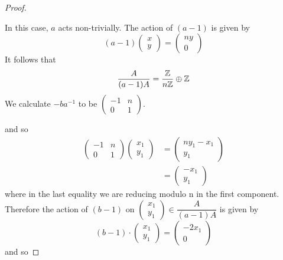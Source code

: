 \begin{proof}
    \begin{case}[Family 2]
        In this case, $a$ acts non-trivially. The action of $(a-1)$ is given by
        $$
            (a-1)\begin{pmatrix}
                x \\
                y
            \end{pmatrix} = \begin{pmatrix}
                ny \\
                0
            \end{pmatrix}
        $$
        It follows that
        $$
            \dfrac{A}{(a-1)A} = \dfrac{\mathbb{Z}}{n\mathbb{Z}} \oplus \mathbb{Z}
        $$
        We calculate $-ba^{-1}$ to be $\begin{pmatrix}
                -1 & n \\
                0  & 1
            \end{pmatrix}$.
    \end{case}
    and so
    \begin{align*}
        \begin{pmatrix}
            -1 & n \\
            0  & 1
        \end{pmatrix} \begin{pmatrix}
                          x_1 \\
                          y_1
                      \end{pmatrix} & = \begin{pmatrix}
                                            ny_1 - x_1 \\
                                            y_1
                                        \end{pmatrix}  \\
                                      & =\begin{pmatrix}
                                             - x_1 \\
                                             y_1
                                         \end{pmatrix}
    \end{align*}
    where in the last equality we are reducing modulo n in the first component. Therefore the action of $(b-1)$ on
    $\begin{pmatrix}
            x_1 \\
            y_1
        \end{pmatrix} \in \dfrac{A}{(a-1)A}$ is given by
    $$
        (b-1)\cdot \begin{pmatrix}
            x_1 \\
            y_1
        \end{pmatrix} = \begin{pmatrix}
            -2x_1 \\
            0
        \end{pmatrix}
    $$
    and so


\end{proof}
